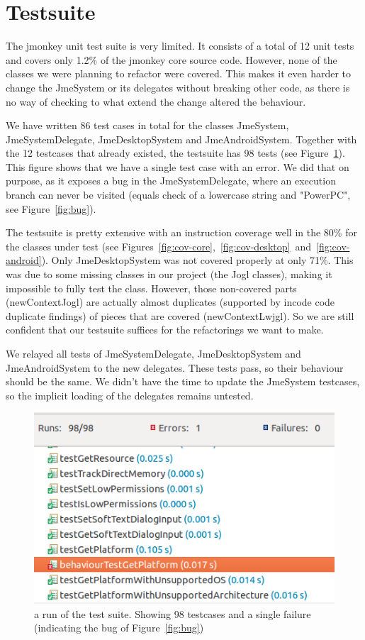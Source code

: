 \documentclass[a4paper, 10pt]{article}
\begin{document}
\section{Testsuite}
\label{sec:testsuite}
The jmonkey unit test suite is very limited.
It consists of a total of 12 unit tests and covers only 1.2\% of the jmonkey core source code.
However, none of the classes we were planning to refactor were covered.
This makes it even harder to change the JmeSystem or its delegates without breaking other code,
as there is no way of checking to what extend the change altered the behaviour.

We have written 86 test cases in total for the classes JmeSystem, JmeSystemDelegate, JmeDesktopSystem and JmeAndroidSystem.
Together with the 12 testcases that already existed, the testsuite has 98 tests (see Figure~\ref{fig:num-tests}).
This figure shows that we have a single test case with an error.
We did that on purpose, as it exposes a bug in the JmeSystemDelegate, 
where an execution branch can never be visited (equals check of a lowercase string and "PowerPC", see Figure~\ref{fig:bug}).

The testsuite is pretty extensive with an instruction coverage well in the 80\% for the classes under test (see Figures~\ref{fig:cov-core},~\ref{fig:cov-desktop}~and~\ref{fig:cov-android}).
Only JmeDesktopSystem was not covered properly at only 71\%. 
This was due to some missing classes in our project (the Jogl classes),
making it impossible to fully test the class. 
However, those non-covered parts (newContextJogl) are actually almost duplicates (supported by incode code duplicate findings) of pieces that are covered (newContextLwjgl).
So we are still confident that our testsuite suffices for the refactorings we want to make.

We relayed all tests of JmeSystemDelegate, JmeDesktopSystem and JmeAndroidSystem to the new delegates.
These tests pass, so their behaviour should be the same.
We didn't have the time to update the JmeSystem testcases, so the implicit loading of the delegates remains untested.

\begin{figure}[!hb]
\includegraphics[width=\textwidth]{figures/86-new-tests.png}
\caption{a run of the test suite. Showing 98 testcases and a single failure (indicating the bug of Figure~\ref{fig:bug})}
\label{fig:num-tests}
\end{figure}
\end{document}

